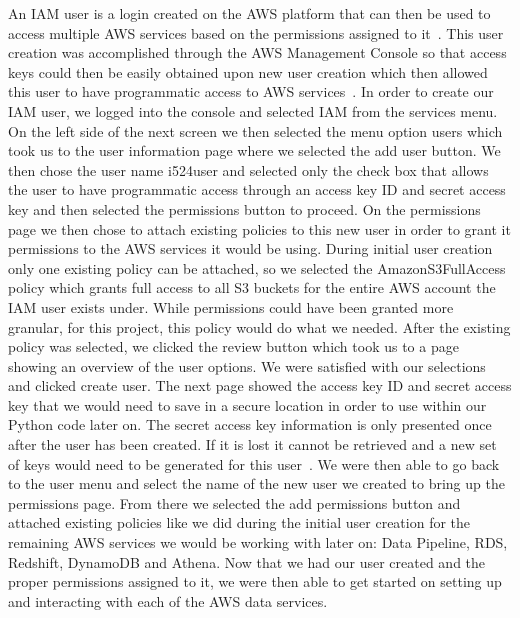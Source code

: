 An IAM user is a login created on the AWS platform that can then be used to 
access multiple AWS services based on the permissions assigned to 
it~\cite{hid-sp18-521-IAMOverview}. This user creation was accomplished 
through the AWS Management Console so that access keys could then be easily 
obtained upon new user creation which then allowed this user to have 
programmatic access to AWS services~\cite{hid-sp18-521-IAMkeys}. In order to 
create our IAM user, we logged into the console and selected IAM from the 
services menu. On the left side of the next screen we then selected the menu 
option users which took us to the user information page where we selected the 
add user button. We then chose the user name i524user and selected only the 
check box that allows the user to have programmatic access through an access 
key ID and secret access key and then selected the permissions button to 
proceed. On the permissions page we then chose to attach existing policies to 
this new user in order to grant it permissions to the AWS services it would be 
using. During initial user creation only one existing policy can be attached, 
so we selected the AmazonS3FullAccess policy which grants full access to all 
S3 buckets for the entire AWS account the IAM user exists under. While 
permissions could have been granted more granular, for this project, this 
policy would do what we needed. After the existing policy was selected, we 
clicked the review button which took us to a page showing an overview of the 
user options. We were satisfied with our selections and clicked create user. 
The next page showed the access key ID and secret access key that we would 
need to save in a secure location in order to use within our Python code later 
on. The secret access key information is only presented once after the user 
has been created. If it is lost it cannot be retrieved and a new set of keys 
would need to be generated for this user~\cite{hid-sp18-521-IAMkeys}. We were 
then able to go back to the user menu and select the name of the new user we 
created to bring up the permissions page. From there we selected the add 
permissions button and attached existing policies like we did during the 
initial user creation for the remaining AWS services we would be working with 
later on: Data Pipeline, RDS, Redshift, DynamoDB and Athena. Now that we had 
our user created and the proper permissions assigned to it, we were then able 
to get started on setting up and interacting with each of the AWS data 
services. 

